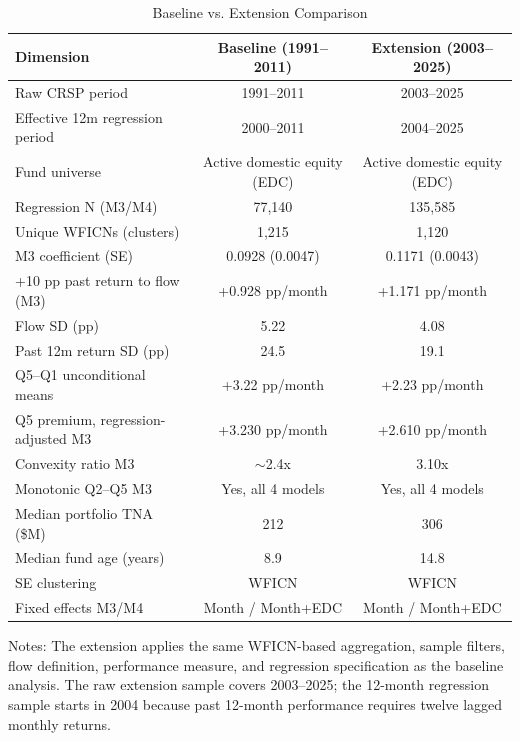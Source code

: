 \documentclass{article}
\begin{document}
\begin{table}[htbp]
\centering
\caption{Baseline vs. Extension Comparison}
\label{tab:baseline-extension-comparison}
\small
\begin{threeparttable}
\begin{tabularx}{\textwidth}{Xcc}
\toprule
Dimension & Baseline (1991--2011) & Extension (2003--2025) \\
\midrule
Raw CRSP period & 1991--2011 & 2003--2025 \\
Effective 12m regression period & 2000--2011 & 2004--2025 \\
Fund universe & Active domestic equity (EDC) & Active domestic equity (EDC) \\
Regression N (M3/M4) & 77,140 & 135,585 \\
Unique WFICNs (clusters) & 1,215 & 1,120 \\
M3 coefficient (SE) & 0.0928 (0.0047) & 0.1171 (0.0043) \\
+10 pp past return to flow (M3) & +0.928 pp/month & +1.171 pp/month \\
Flow SD (pp) & 5.22 & 4.08 \\
Past 12m return SD (pp) & 24.5 & 19.1 \\
Q5--Q1 unconditional means & +3.22 pp/month & +2.23 pp/month \\
Q5 premium, regression-adjusted M3 & +3.230 pp/month & +2.610 pp/month \\
Convexity ratio M3 & $\sim$2.4x & 3.10x \\
Monotonic Q2--Q5 M3 & Yes, all 4 models & Yes, all 4 models \\
Median portfolio TNA (\$M) & 212 & 306 \\
Median fund age (years) & 8.9 & 14.8 \\
SE clustering & WFICN & WFICN \\
Fixed effects M3/M4 & Month / Month+EDC & Month / Month+EDC \\
\bottomrule
\end{tabularx}
\begin{tablenotes}
\footnotesize
\item Notes: The extension applies the same WFICN-based aggregation, sample filters, flow definition, performance measure, and regression specification as the baseline analysis. The raw extension sample covers 2003--2025; the 12-month regression sample starts in 2004 because past 12-month performance requires twelve lagged monthly returns.
\end{tablenotes}
\end{threeparttable}
\end{table}
\end{document}
